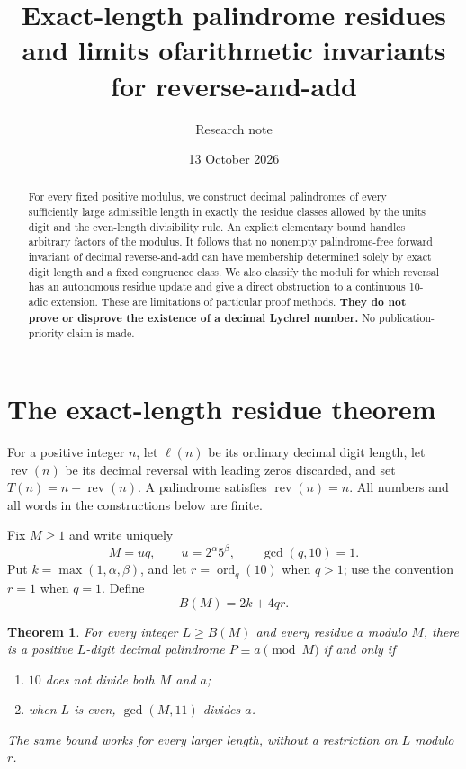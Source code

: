 \documentclass[11pt]{article}
\title{Exact-length palindrome residues and limits of\newline arithmetic invariants for reverse-and-add}
\author{Research note}
\date{13 October 2026}
\newtheorem{theorem}{Theorem}
\newcommand{\rev}{\operatorname{rev}}
\newcommand{\len}{\ell}
\newcommand{\ord}{\operatorname{ord}}
\begin{document}
\maketitle
\begin{abstract}
For every fixed positive modulus, we construct decimal palindromes of
every sufficiently large admissible length in exactly the residue classes
allowed by the units digit and the even-length divisibility rule. An explicit
elementary bound handles arbitrary factors of the modulus. It follows that
no nonempty palindrome-free forward invariant of decimal reverse-and-add
can have membership determined solely by exact digit length and a fixed
congruence class. We also classify the moduli for which reversal has an
autonomous residue update and give a direct obstruction to a continuous
10-adic extension. These are limitations of particular proof methods.
\textbf{They do not prove or disprove the existence of a decimal Lychrel
number.} No publication-priority claim is made.
\end{abstract}

\section{The exact-length residue theorem}
For a positive integer $n$, let $\len(n)$ be its ordinary decimal digit
length, let $\rev(n)$ be its decimal reversal with leading zeros discarded,
and set $T(n)=n+\rev(n)$. A palindrome satisfies $\rev(n)=n$.
All numbers and all words in the constructions below are finite.

Fix $M\geq1$ and write uniquely
\[
 M=uq,\qquad u=2^\alpha5^\beta,\qquad \gcd(q,10)=1.
\]
Put $k=\max(1,\alpha,\beta)$, and let $r=\ord_q(10)$ when $q>1$;
use the convention $r=1$ when $q=1$. Define
\[
 B(M)=2k+4qr.
\]

\begin{theorem}\label{thm:saturation}
For every integer $L\geq B(M)$ and every residue $a$ modulo $M$, there is
a positive $L$-digit decimal palindrome $P\equiv a\pmod M$ if and only if
\begin{enumerate}[label=(\roman*)]
\item $10$ does not divide both $M$ and $a$;
\item when $L$ is even, $\gcd(M,11)$ divides $a$.
\end{enumerate}
The same bound works for every larger length, without a restriction on
$L$ modulo $r$.
\end{theorem}
\end{document}
